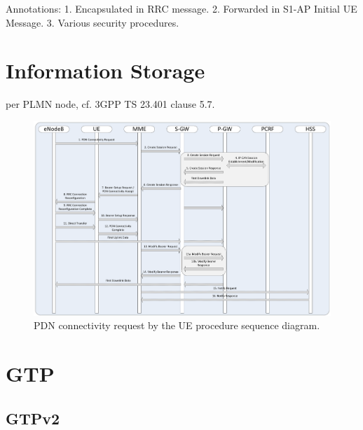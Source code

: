 Annotations:
1. Encapsulated in RRC message.
2. Forwarded in S1-AP Initial UE Message.
3. Various security procedures.


\section{Information Storage}
per PLMN node, cf. 3GPP TS 23.401 clause 5.7.

\begin{figure}[htbp]
	\centering
	\includegraphics[width=1.2\textwidth]{images/UE-requested-PDN-connectivity.pdf}
	\caption{PDN connectivity request by the UE procedure sequence diagram.}
	\label{c4:fig:3gpp-uepdnreq}
\end{figure}


\section{GTP}
\subsection{GTPv2}


